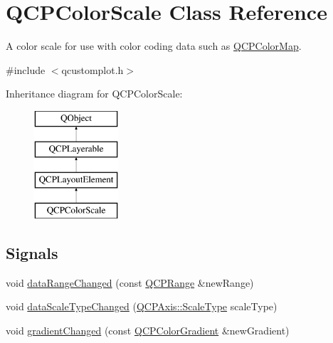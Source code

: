 \hypertarget{class_q_c_p_color_scale}{}\section{Q\+C\+P\+Color\+Scale Class Reference}
\label{class_q_c_p_color_scale}


A color scale for use with color coding data such as \mbox{\hyperlink{class_q_c_p_color_map}{Q\+C\+P\+Color\+Map}}.  




{\ttfamily \#include $<$qcustomplot.\+h$>$}

Inheritance diagram for Q\+C\+P\+Color\+Scale\+:\begin{figure}[H]
\begin{center}
\leavevmode
\includegraphics[height=4.000000cm]{da/d2b/class_q_c_p_color_scale}
\end{center}
\end{figure}
\subsection*{Signals}
\begin{DoxyCompactItemize}
\item 
void \mbox{\hyperlink{class_q_c_p_color_scale_a685717490a6aa83c5e711a4f34e837f9}{data\+Range\+Changed}} (const \mbox{\hyperlink{class_q_c_p_range}{Q\+C\+P\+Range}} \&new\+Range)
\item 
void \mbox{\hyperlink{class_q_c_p_color_scale_a61558b962f7791ff2f15a565dcf60181}{data\+Scale\+Type\+Changed}} (\mbox{\hyperlink{class_q_c_p_axis_a36d8e8658dbaa179bf2aeb973db2d6f0}{Q\+C\+P\+Axis\+::\+Scale\+Type}} scale\+Type)
\item 
void \mbox{\hyperlink{class_q_c_p_color_scale_a5e5f8c5626242c8f7308bfab74d3d989}{gradient\+Changed}} (const \mbox{\hyperlink{class_q_c_p_color_gradient}{Q\+C\+P\+Color\+Gradient}} \&new\+Gradient)
\end{DoxyCompactItemize}
